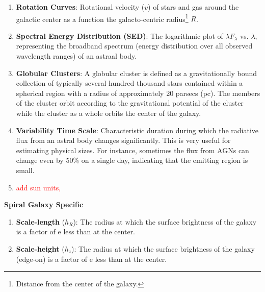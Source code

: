 \documentclass[a4paper,11pt]{report}
\newcommand{\red}[1]{\textcolor{red}{#1}}
\newcommand{\tb}[1]{\textbf{#1}}
\begin{document}
\begin{enumerate}[leftmargin=*, label=\roman*., itemsep=0.8em]
  \item \tb{Rotation Curves}: Rotational velocity ($v$) of stars and gas around the galactic center as a function the galacto-centric radius\footnote{Distance from the center of the galaxy.} $R$.
    
  \item \tb{Spectral Energy Distribution (SED)}: The logarithmic plot of $\lambda F_\lambda$ vs. $\lambda$, representing the broadband spectrum (energy distribution over all observed wavelength ranges) of an astraal body. \label{def:SED}
    
  \item \tb{Globular Clusters}: A globular cluster is defined as a gravitationally bound collection of typically several hundred thousand stars contained within a spherical region with a radius of approximately 20 parsecs (pc). The members of the cluster orbit according to the gravitational potential of the cluster while the cluster as a whole orbits the center of the galaxy.\label{def:globular clusters}
    
  \item \tb{Variability Time Scale}: Characteristic duration during which the radiative flux from an astral body changes significantly. This is very useful for estimating physical sizes. For instance, sometimes the flux from AGNs can change even by 50\% on a single day, indicating that the emitting region is small.
    
  \item \red{add sun units, \Sun}
\end{enumerate}

\textbf{Spiral Galaxy Specific}

\begin{enumerate}[leftmargin=*, label=\roman*., itemsep=0.8em]
  \item \tb{Scale-length} ($h_R$): The radius at which the surface brightness of the galaxy is a factor of e less than at the center. \label{def:scale-length}
    
  \item \tb{Scale-height} ($h_z$): The radius at which the surface brightness of the galaxy (edge-on) is a factor of e less than at the center. \label{def:scale-height}
\end{enumerate}

\clearpage

\end{document}
